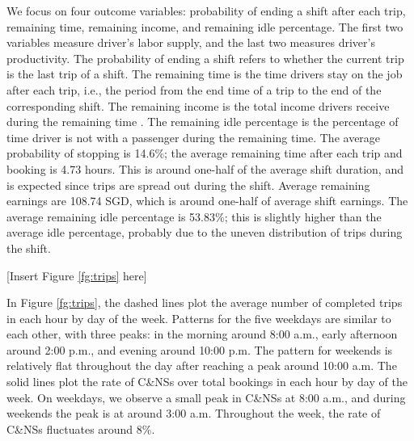 \documentclass[reviewmode]{restud}
\begin{document}
We focus on four outcome variables: probability of ending a shift after each trip, remaining time, remaining income, and remaining idle percentage. The first two variables measure driver's labor supply, and the last two measures driver's productivity. The probability of ending a shift refers to whether the current trip is the last trip of a shift. The remaining time is the time drivers stay on the job after each trip, i.e., the period from the end time of a trip to the end of the corresponding shift. The remaining income is the total income drivers receive during the remaining time%
. The remaining idle percentage is the percentage of time driver is not with a passenger during the remaining time. The average probability of stopping is 14.6\%; the average remaining time after each trip and booking is 4.73 hours. This is around one-half of the average shift duration, and is expected since trips are spread out during the shift. Average remaining earnings are 108.74 SGD, which is around one-half of average shift earnings. The average remaining idle percentage is 53.83\%; this is slightly higher than the average idle percentage, probably due to the uneven distribution of trips during the shift.

\begin{center}
	[Insert Figure \ref{fg:trips} here]
\end{center}

In Figure \ref{fg:trips}, the dashed lines plot the average number of completed trips in each hour by day of the week. Patterns for the five weekdays are similar to each other, with three peaks: in the morning around 8:00 a.m., early afternoon around 2:00 p.m., and evening around 10:00 p.m. The pattern for weekends is relatively flat throughout the day after reaching a peak around 10:00 a.m. The solid lines plot the rate of C\&NSs over total bookings in each hour by day of the week. On weekdays, we observe a small peak in C\&NSs at 8:00 a.m., and during weekends the peak is at around 3:00 a.m. Throughout the week, the rate of C\&NSs fluctuates around 8\%.
\end{document}
